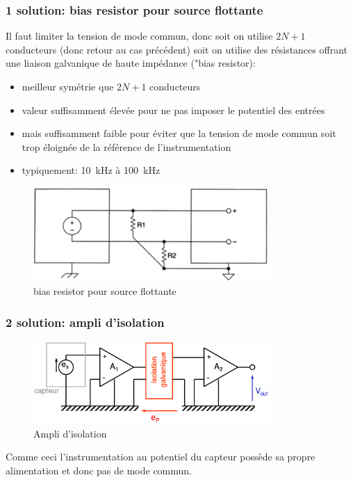\subsubsection{1 solution: bias resistor pour source flottante}
Il faut limiter la tension de mode commun, donc soit on utilise \(2N+1\) conducteurs (donc retour au cas précédent) soit on utilise des résistances offrant une liaison galvanique de haute impédance ("bias resistor):
\begin{itemize}
	\item meilleur symétrie que \(2N+1\) conducteurs
	\item valeur suffisamment élevée pour ne pas imposer le potentiel des entrées
	\item mais suffisamment faible pour éviter que la tension de mode commun soit trop éloignée de la référence de l’instrumentation
	\item typiquement: \SI{10}{\kilo\hertz} à \SI{100}{\kilo\hertz}
\end{itemize}
\begin{figure}[H] 
	\centering 
	\includegraphics[width=0.8\textwidth,height=10\baselineskip,keepaspectratio]{ch3/image21} 
	\caption{bias resistor pour source flottante} 
\end{figure}
\subsubsection{2 solution: ampli d'isolation}
\begin{figure}[H] 
	\centering 
	\includegraphics[width=0.8\textwidth,height=10\baselineskip,keepaspectratio]{ch3/image22} 
	\caption{Ampli d'isolation} 
\end{figure}
Comme ceci l'instrumentation au potentiel du capteur possède sa propre alimentation et donc pas de mode commun.
